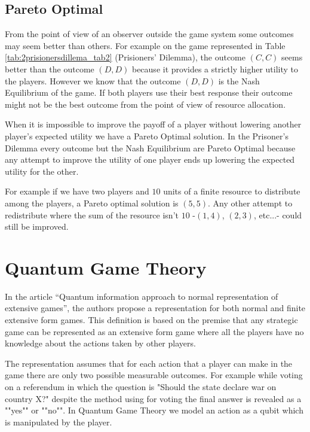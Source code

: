 \subsection{Pareto Optimal}
\label{subsec:background:game_theory_pareto_optimal}

From the point of view of an observer outside the game system some outcomes may seem better than others. For example on the game represented in Table \ref{tab:2prisionersdillema_tab2} (Prisioners' Dilemma), the outcome $(C,C)$ seems better than the outcome $(D,D)$ because it provides a strictly higher utility to the players. However we know that the outcome $(D,D)$ is the Nash Equilibrium of the game. If both players use their best response their outcome might not be the best outcome from the point of view of resource allocation.

When it is impossible to improve the payoff of a player without lowering another player's expected utility we have a Pareto Optimal solution. In the Prisoner's Dilemma every outcome but the Nash Equilibrium are Pareto Optimal because any attempt to improve the utility of one player ends up lowering the expected utility for the other.

For example if we have two players and $10$ units of a finite resource to distribute among the players, a Pareto optimal solution is $(5,5)$. Any other attempt to redistribute where the sum of the resource isn't $10$ -$(1,4)$, $(2,3)$, etc...- could still be improved.


\clearpage
\section{Quantum Game Theory}
\label{sec:background_quantum_game_theory}



In the article ``Quantum information approach to normal representation of extensive games''\cite{Fra2011a}, the authors propose a representation
for both normal and finite extensive form games\cite{Fra2011}. This definition is based on the premise that any strategic game can be represented as an extensive form game where all the players have no knowledge about the actions taken by other players. 

The representation assumes that for each action that a player can make in the game there are only two possible measurable outcomes. For example while voting on a referendum in which the question is "Should the state declare war on country X?" despite the method using for voting the final answer is revealed as a ""yes"" or ""no"".
In Quantum Game Theory we model an action as a qubit which is manipulated by the player. 


